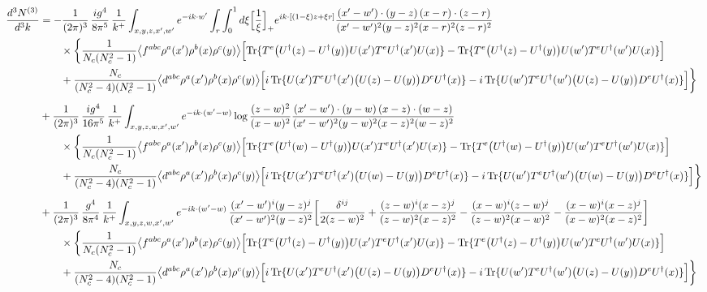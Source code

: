 \documentclass[10pt]{article}
\begin{document}
\begin{align}
\frac{d^{3}N^{(3)}}{d^{3}k}&=-\frac{1}{(2\pi)^{3}}\,\frac{ig^{4}}{8\pi^{5}}\,\frac{1}{k^{+}}\int_{x,y,z,x',w'}e^{-ik\cdot w'}\int_{r}\int_{0}^{1}d\xi\Big[\frac1\xi\Big]_{+}e^{ik\cdot[(1-\xi)z+\xi r]}\frac{(x'-w')\cdot(y-z)\,(x-r)\cdot(z-r)}{(x'-w')^{2}(y-z)^{2}(x-r)^{2}(z-r)^{2}}\notag\\
&\qquad\times\bigg\{\frac{1}{N_{c}(N_{c}^{2}-1)}\big\langle f^{abc}\rho^{a}(x')\rho^{b}(x)\rho^{c}(y)\big\rangle\Big[{\rm Tr}\{T^{e}\big(U^{\dagger}(z)-U^{\dagger}(y)\big)U(x')T^{e}U^{\dagger}(x')U(x)\}-{\rm Tr}\{T^{e}\big(U^{\dagger}(z)-U^{\dagger}(y)\big)U(w')T^{e}U^{\dagger}(w')U(x)\}\Big]\notag\\&\qquad+\frac{N_{c}}{(N_{c}^{2}-4)(N_{c}^{2}-1)}\big\langle d^{abc}\rho^{a}(x')\rho^{b}(x)\rho^{c}(y)\big\rangle\Big[i\,{\rm Tr}\{U(x')T^{e}U^{\dagger}(x')\big(U(z)-U(y)\big)D^{e}U^{\dagger}(x)\}-i\,{\rm Tr}\{U(w')T^{e}U^{\dagger}(w')\big(U(z)-U(y)\big)D^{e}U^{\dagger}(x)\}\Big]\bigg\}\notag\\[6pt]
&+\frac{1}{(2\pi)^{3}}\,\frac{ig^{4}}{16\pi^{5}}\,\frac{1}{k^{+}}\int_{x,y,z,w,x',w'}e^{-ik\cdot(w'-w)}\log\frac{(z-w)^{2}}{(x-w)^{2}}\frac{(x'-w')\cdot(y-w)\,(x-z)\cdot(w-z)}{(x'-w')^{2}(y-w)^{2}(x-z)^{2}(w-z)^{2}}\notag\\
&\qquad\times\bigg\{\frac{1}{N_{c}(N_{c}^{2}-1)}\big\langle f^{abc}\rho^{a}(x')\rho^{b}(x)\rho^{c}(y)\big\rangle\Big[{\rm Tr}\{T^{e}\big(U^{\dagger}(w)-U^{\dagger}(y)\big)U(x')T^{e}U^{\dagger}(x')U(x)\}-{\rm Tr}\{T^{e}\big(U^{\dagger}(w)-U^{\dagger}(y)\big)U(w')T^{e}U^{\dagger}(w')U(x)\}\Big]\notag\\&\qquad+\frac{N_{c}}{(N_{c}^{2}-4)(N_{c}^{2}-1)}\big\langle d^{abc}\rho^{a}(x')\rho^{b}(x)\rho^{c}(y)\big\rangle\Big[i\,{\rm Tr}\{U(x')T^{e}U^{\dagger}(x')\big(U(w)-U(y)\big)D^{e}U^{\dagger}(x)\}-i\,{\rm Tr}\{U(w')T^{e}U^{\dagger}(w')\big(U(w)-U(y)\big)D^{e}U^{\dagger}(x)\}\Big]\bigg\}\notag\\[6pt]
&+\frac{1}{(2\pi)^{3}}\,\frac{g^{4}}{8\pi^{4}}\,\frac{1}{k^{+}}\int_{x,y,z,w,x',w'}e^{-ik\cdot(w'-w)}\,\frac{(x'-w')^{i}(y-z)^{j}}{(x'-w')^{2}(y-z)^{2}}\bigg[\frac{\delta^{ij}}{2(z-w)^{2}}+\frac{(z-w)^{i}(x-z)^{j}}{(z-w)^{2}(x-z)^{2}}-\frac{(x-w)^{i}(z-w)^{j}}{(z-w)^{2}(x-w)^{2}}-\frac{(x-w)^{i}(x-z)^{j}}{(x-w)^{2}(x-z)^{2}}\bigg]\notag\\
&\qquad\times\bigg\{\frac{1}{N_{c}(N_{c}^{2}-1)}\big\langle f^{abc}\rho^{a}(x')\rho^{b}(x)\rho^{c}(y)\big\rangle\Big[{\rm Tr}\{T^{e}\big(U^{\dagger}(z)-U^{\dagger}(y)\big)U(x')T^{e}U^{\dagger}(x')U(x)\}-{\rm Tr}\{T^{e}\big(U^{\dagger}(z)-U^{\dagger}(y)\big)U(w')T^{e}U^{\dagger}(w')U(x)\}\Big]\notag\\&\qquad+\frac{N_{c}}{(N_{c}^{2}-4)(N_{c}^{2}-1)}\big\langle d^{abc}\rho^{a}(x')\rho^{b}(x)\rho^{c}(y)\big\rangle\Big[i\,{\rm Tr}\{U(x')T^{e}U^{\dagger}(x')\big(U(z)-U(y)\big)D^{e}U^{\dagger}(x)\}-i\,{\rm Tr}\{U(w')T^{e}U^{\dagger}(w')\big(U(z)-U(y)\big)D^{e}U^{\dagger}(x)\}\Big]\bigg\}\notag\\[6pt]

\end{align}
\end{document}
